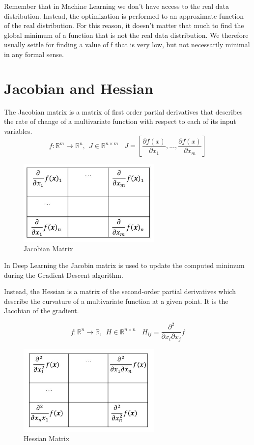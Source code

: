 Remember that in Machine Learning we don't have access to the real data distribution. Instead, the optimization is performed to an approximate function of the real distribution. For this reason, it doesn't matter that much to find the global minimum of a function that is not the real data distribution. We therefore usually settle for finding a value of f that is very low, but not necessarily minimal in any formal sense.

\newpage

\section{Jacobian and Hessian}

The Jacobian matrix is a matrix of first order partial derivatives that describes the rate of change of a multivariate function with respect to each of its input variables.
$$ f: \mathbb{R}^{m} \rightarrow \mathbb{R}^{n}, ~~ J \in \mathbb{R}^{n \times m} ~~~~ J = \left[ \frac{\partial f(x)}{\partial x_1}, ..., \frac{\partial f(x)}{\partial x_m}  \right] $$

\begin{figure}[h]
    \centering
    \includegraphics[width=7cm]{Images/jacobian.jpg}
    \caption{Jacobian Matrix}
\end{figure}

\noindent In Deep Learning the Jacobin matrix is used to update the computed minimum during the Gradient Descent algorithm.

\noindent Instead, the Hessian is a matrix of the second-order partial derivatives which describe the curvature of a multivariate function at a given point. It is the Jacobian of the gradient.

$$ f: \mathbb{R}^{n} \rightarrow \mathbb{R}, ~~ H \in \mathbb{R}^{n \times n} ~~~~ H_{ij} = \frac{\partial^2}{\partial x_i \partial x_j} f $$

\begin{figure}[h]
    \centering
    \includegraphics[width=7cm]{Images/hessian.jpg}
    \caption{Hessian Matrix}
\end{figure}

